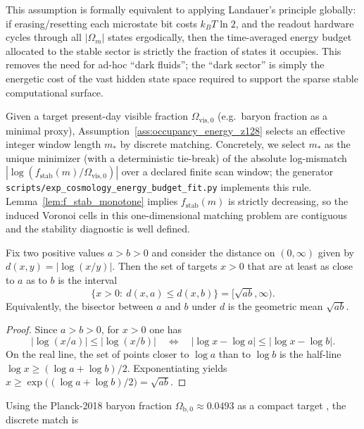 \begin{remark}
This assumption is formally equivalent to applying Landauer's principle \cite{Landauer1961} globally: if erasing/resetting each microstate bit costs $k_B T \ln 2$, and the readout hardware cycles through all $|\Omega_m|$ states ergodically, then the time-averaged energy budget allocated to the stable sector is strictly the fraction of states it occupies.
This removes the need for ad-hoc ``dark fluids''; the ``dark sector'' is simply the energetic cost of the vast hidden state space required to support the sparse stable computational surface.
\end{remark}

\InterfaceTag Given a target present-day visible fraction $\Omega_{\mathrm{vis},0}$ (e.g.\ baryon fraction as a minimal proxy), Assumption~\ref{ass:occupancy_energy_z128} selects an effective integer window length $m_\ast$ by discrete matching.
\MatchTag Concretely, we select $m_\ast$ as the unique minimizer (with a deterministic tie-break) of the absolute log-mismatch $|\log(f_{\mathrm{stab}}(m)/\Omega_{\mathrm{vis},0})|$ over a declared finite scan window; the generator \texttt{scripts/exp\_cosmology\_energy\_budget\_fit.py} implements this rule.
Lemma~\ref{lem:f_stab_monotone} implies $f_{\mathrm{stab}}(m)$ is strictly decreasing, so the induced Voronoi cells in this one-dimensional matching problem are contiguous and the stability diagnostic is well defined.
\begin{lemma}\label{lem:log_voronoi_geometric_mean}
\MathTag Fix two positive values $a>b>0$ and consider the distance on $(0,\infty)$ given by $d(x,y)=|\log(x/y)|$.
Then the set of targets $x>0$ that are at least as close to $a$ as to $b$ is the interval
\[
\{x>0:\ d(x,a)\le d(x,b)\}=[\sqrt{ab},\infty).
\]
Equivalently, the bisector between $a$ and $b$ under $d$ is the geometric mean $\sqrt{ab}$.
\end{lemma}
\begin{proof}
Since $a>b>0$, for $x>0$ one has
\[
|\log(x/a)|\le |\log(x/b)|
\quad\Longleftrightarrow\quad
|\log x-\log a|\le |\log x-\log b|.
\]
On the real line, the set of points closer to $\log a$ than to $\log b$ is the half-line $\log x\ge (\log a+\log b)/2$.
Exponentiating yields $x\ge \exp\bigl((\log a+\log b)/2\bigr)=\sqrt{ab}$.
\end{proof}
\MatchTag Using the Planck-2018 baryon fraction $\Omega_{\mathrm{b},0}\approx 0.0493$ as a compact target \cite{Planck2018Parameters}, the discrete match is
